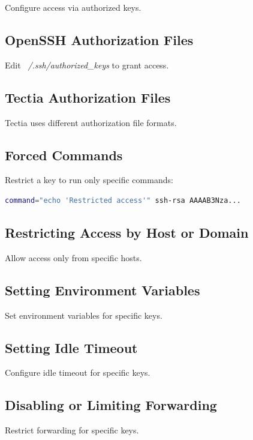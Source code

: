 \documentclass[12pt]{book}
\begin{document}
Configure access via authorized keys.

\subsection{OpenSSH Authorization Files}

Edit \textit{~/.ssh/authorized\_keys} to grant access.

\subsection{Tectia Authorization Files}

Tectia uses different authorization file formats.

\subsection{Forced Commands}

Restrict a key to run only specific commands:

\begin{lstlisting}[language=bash]
command="echo 'Restricted access'" ssh-rsa AAAAB3Nza...
\end{lstlisting}

\subsection{Restricting Access by Host or Domain}

Allow access only from specific hosts.

\subsection{Setting Environment Variables}

Set environment variables for specific keys.

\subsection{Setting Idle Timeout}

Configure idle timeout for specific keys.

\subsection{Disabling or Limiting Forwarding}

Restrict forwarding for specific keys.
\end{document}
